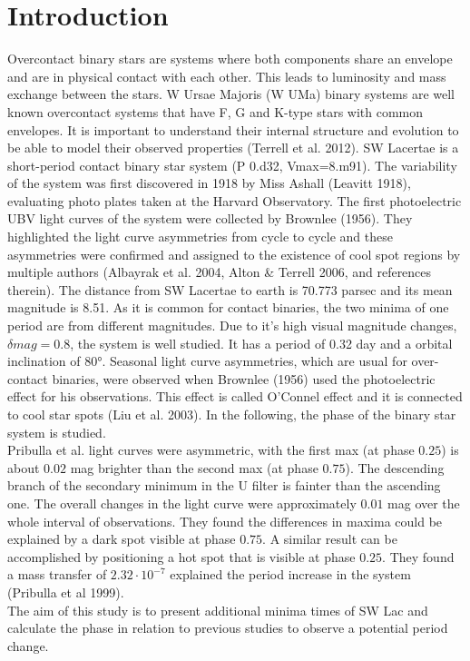 \section{Introduction}
\label{sec:Theorie}

Overcontact binary stars are systems where both components share an envelope and 
are in physical contact with each other. This leads to luminosity and mass exchange 
between the stars. W Ursae Majoris (W UMa) binary systems are well known overcontact 
systems that have F, G and K-type stars with common envelopes. It is important to 
understand their internal structure and evolution to be able to model their observed 
properties (Terrell et al. 2012). SW Lacertae is a short-period contact binary star 
system (P 0.d32, Vmax=8.m91). The variability of the system was first discovered in 
1918 by Miss Ashall (Leavitt 1918), evaluating photo plates taken at the Harvard Observatory. 
The first photoelectric 
UBV light curves of the system were collected by Brownlee (1956). They highlighted the 
light curve asymmetries from cycle to cycle and these asymmetries were confirmed and 
assigned to the existence of cool spot regions by multiple authors (Albayrak et al. 
2004, Alton \& Terrell 2006, and references therein). The distance from SW Lacertae to 
earth is 70.773 parsec and its mean magnitude is 8.51. As it is common for contact 
binaries, the two minima of one period are from different magnitudes. Due to it’s 
high visual magnitude changes, $\delta mag = 0.8$, the system is well studied. It has a 
period of 0.32 day and a orbital inclination of 80°. Seasonal light curve asymmetries,
 which are usual for over-contact binaries, were observed when Brownlee (1956) used the
  photoelectric effect for his observations. This effect is called O’Connel effect and 
  it is connected to cool star spots (Liu et al. 2003). 
In the following, the phase of the binary star system is studied.   \\
Pribulla et al. light curves were asymmetric, with the first max (at phase $0.25$) is about 
$0.02$ mag brighter than the second max (at phase $0.75$). The descending branch of the 
secondary minimum in the U filter is fainter than the ascending one. The overall changes 
in the light curve were approximately $0.01$ mag over the whole interval of observations. 
They found the differences in maxima could be explained by a dark spot visible at phase $0.75$.
 A similar result can be accomplished by positioning a hot spot that is visible at phase $0.25$.
  They found a mass transfer of $2.32 \cdot 10^{-7}$ explained the period increase in the system 
  (Pribulla et al 1999).\\

The aim of this study is to present additional minima times of SW Lac and calculate the phase in 
relation to previous studies to observe a potential period change. 
